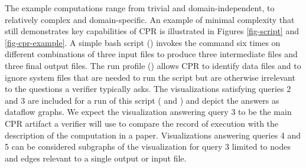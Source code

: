The example computations range from trivial and domain-independent, to relatively complex and domain-specific. An example of minimal complexity that still demonstrates key capabilities of CPR is illustrated in Figures \ref{fig-script} and \ref{fig-cpr-example}. A simple bash script () invokes the  command six times on different combinations of three input files to produce three intermediate files and three final output files. The run profile () allows CPR to identify data files and to ignore system files that are needed to run the script but are otherwise irrelevant to the questions a verifier typically asks.  The visualizations satisfying queries 2 and 3 are included for a run of this script ( and ) and depict the answers as dataflow graphs. We expect the visualization answering query 3 to be the main CPR artifact a verifier will use to compare the record of execution with the description of the computation in a paper. Visualizations answering queries 4 and 5 can be considered subgraphs of the visualization for query 3 limited to nodes and edges relevant to a single output or input file.
 
